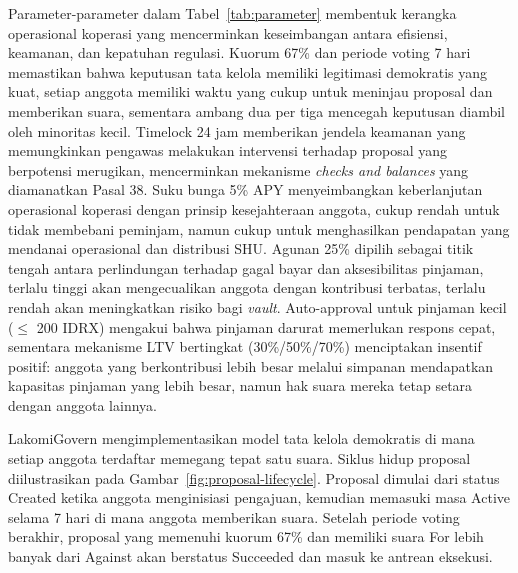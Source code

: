 Parameter-parameter dalam Tabel~\ref{tab:parameter} membentuk kerangka operasional koperasi yang mencerminkan keseimbangan antara efisiensi, keamanan, dan kepatuhan regulasi. Kuorum 67\% dan periode voting 7 hari memastikan bahwa keputusan tata kelola memiliki legitimasi demokratis yang kuat, setiap anggota memiliki waktu yang cukup untuk meninjau proposal dan memberikan suara, sementara ambang dua per tiga mencegah keputusan diambil oleh minoritas kecil. Timelock 24 jam memberikan jendela keamanan yang memungkinkan pengawas melakukan intervensi terhadap proposal yang berpotensi merugikan, mencerminkan mekanisme \textit{checks and balances} yang diamanatkan Pasal 38. Suku bunga 5\% APY menyeimbangkan keberlanjutan operasional koperasi dengan prinsip kesejahteraan anggota, cukup rendah untuk tidak membebani peminjam, namun cukup untuk menghasilkan pendapatan yang mendanai operasional dan distribusi SHU. Agunan 25\% dipilih sebagai titik tengah antara perlindungan terhadap gagal bayar dan aksesibilitas pinjaman, terlalu tinggi akan mengecualikan anggota dengan kontribusi terbatas, terlalu rendah akan meningkatkan risiko bagi \textit{vault}. Auto-approval untuk pinjaman kecil ($\leq$ 200 IDRX) mengakui bahwa pinjaman darurat memerlukan respons cepat, sementara mekanisme LTV bertingkat (30\%/50\%/70\%) menciptakan insentif positif: anggota yang berkontribusi lebih besar melalui simpanan mendapatkan kapasitas pinjaman yang lebih besar, namun hak suara mereka tetap setara dengan anggota lainnya.

LakomiGovern mengimplementasikan model tata kelola demokratis di mana setiap anggota terdaftar memegang tepat satu suara. Siklus hidup proposal diilustrasikan pada Gambar~\ref{fig:proposal-lifecycle}. Proposal dimulai dari status Created ketika anggota menginisiasi pengajuan, kemudian memasuki masa Active selama 7 hari di mana anggota memberikan suara. Setelah periode voting berakhir, proposal yang memenuhi kuorum 67\% dan memiliki suara For lebih banyak dari Against akan berstatus Succeeded dan masuk ke antrean eksekusi.

